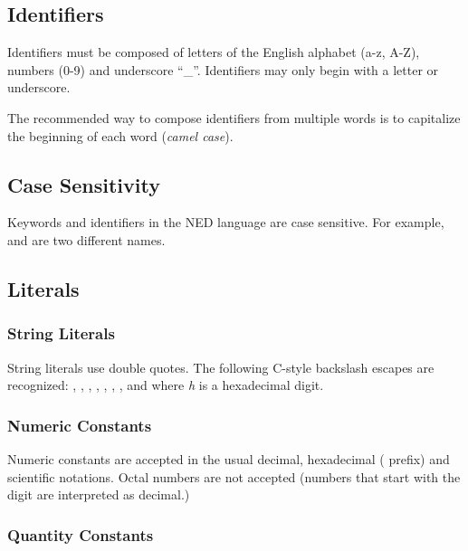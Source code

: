 \subsection{Identifiers}
\label{sec:ned-ref:identifiers}

Identifiers must be composed of letters of the English alphabet (a-z, A-Z),
numbers (0-9) and underscore ``\_''. Identifiers may only begin with a
letter or underscore.

The recommended way to compose identifiers from multiple words is to
capitalize the beginning of each word (\textit{camel case}).


\subsection{Case Sensitivity}
\label{sec:ned-ref:case-sensitivity}

Keywords and identifiers in the NED language are case sensitive. For example,
 and  are two different names.


\subsection{Literals}
\label{sec:ned-ref:literals}

\subsubsection{String Literals}
\label{sec:ned-ref:string-literals}

String literals use double quotes. The following C-style backslash escapes
are recognized: , ,
, , ,
\ttt{{\textbackslash}{\textbackslash}}, , and
 where \textit{h} is a hexadecimal digit.

\subsubsection{Numeric Constants}
\label{sec:ned-ref:numeric-constants}

Numeric constants are accepted in the usual decimal, hexadecimal ( prefix)
and scientific notations. Octal numbers are not accepted (numbers that start
with the  digit are interpreted as decimal.)

\subsubsection{Quantity Constants}
\label{sec:ned-ref:quantity-constants}

